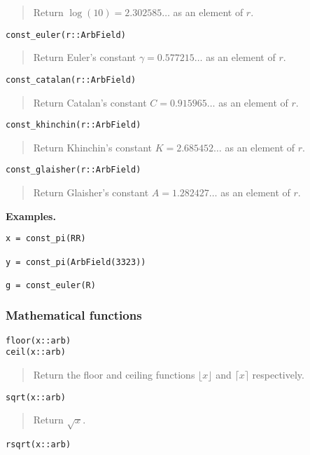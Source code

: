 \documentclass[a4paper,10pt]{article}
\newcommand{\desc}[1]{\vspace{-3mm}\begin{quote}#1\end{quote}}
\begin{document}
{{\desc{Return $\log(10) = 2.302585\ldots$ as an element of $r$.}

\begin{lstlisting}
const_euler(r::ArbField)
\end{lstlisting}

\desc{Return Euler's constant $\gamma = 0.577215\ldots$ as an element of $r$.}

\begin{lstlisting}
const_catalan(r::ArbField)
\end{lstlisting}

\desc{Return Catalan's constant $C = 0.915965\ldots$ as an element of $r$.}

\begin{lstlisting}
const_khinchin(r::ArbField)
\end{lstlisting}

\desc{Return Khinchin's constant $K = 2.685452\ldots$ as an element of $r$.}

\begin{lstlisting}
const_glaisher(r::ArbField)
\end{lstlisting}

\desc{Return Glaisher's constant $A = 1.282427\ldots$ as an element of $r$.}

\textbf{Examples.}

\begin{lstlisting}
x = const_pi(RR)

y = const_pi(ArbField(3323))

g = const_euler(R)
\end{lstlisting}

\subsubsection{Mathematical functions}

\begin{lstlisting}
floor(x::arb)
ceil(x::arb)
\end{lstlisting}

\desc{Return the floor and ceiling functions $\lfloor x \rfloor$ and
$\lceil x \rceil$ respectively.}

\begin{lstlisting}
sqrt(x::arb)
\end{lstlisting}

\desc{Return $\sqrt{x}$.}

\begin{lstlisting}
rsqrt(x::arb)
\end{lstlisting}

}}
\end{document}
